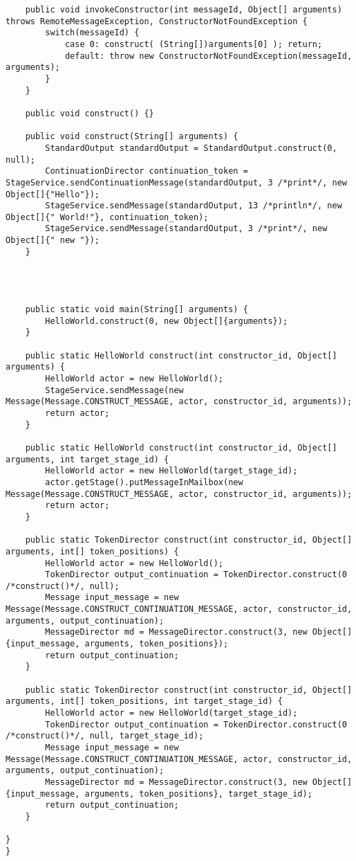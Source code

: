 \documentclass[12pt]{article}
\begin{document}
\begin{lstlisting}
    public void invokeConstructor(int messageId, Object[] arguments) throws RemoteMessageException, ConstructorNotFoundException {
        switch(messageId) {
            case 0: construct( (String[])arguments[0] ); return;
            default: throw new ConstructorNotFoundException(messageId, arguments);
        }
    }

    public void construct() {}

    public void construct(String[] arguments) {
        StandardOutput standardOutput = StandardOutput.construct(0, null);
        ContinuationDirector continuation_token = StageService.sendContinuationMessage(standardOutput, 3 /*print*/, new Object[]{"Hello"});
        StageService.sendMessage(standardOutput, 13 /*println*/, new Object[]{" World!"}, continuation_token);
        StageService.sendMessage(standardOutput, 3 /*print*/, new Object[]{" new "});
    }




    public static void main(String[] arguments) {
        HelloWorld.construct(0, new Object[]{arguments});
    }

    public static HelloWorld construct(int constructor_id, Object[] arguments) {
        HelloWorld actor = new HelloWorld();
        StageService.sendMessage(new Message(Message.CONSTRUCT_MESSAGE, actor, constructor_id, arguments));
        return actor;
    }

    public static HelloWorld construct(int constructor_id, Object[] arguments, int target_stage_id) {
        HelloWorld actor = new HelloWorld(target_stage_id);
        actor.getStage().putMessageInMailbox(new Message(Message.CONSTRUCT_MESSAGE, actor, constructor_id, arguments));
        return actor;
    }

    public static TokenDirector construct(int constructor_id, Object[] arguments, int[] token_positions) {
        HelloWorld actor = new HelloWorld();
        TokenDirector output_continuation = TokenDirector.construct(0 /*construct()*/, null);
        Message input_message = new Message(Message.CONSTRUCT_CONTINUATION_MESSAGE, actor, constructor_id, arguments, output_continuation);
        MessageDirector md = MessageDirector.construct(3, new Object[]{input_message, arguments, token_positions});
        return output_continuation;
    }

    public static TokenDirector construct(int constructor_id, Object[] arguments, int[] token_positions, int target_stage_id) {
        HelloWorld actor = new HelloWorld(target_stage_id);
        TokenDirector output_continuation = TokenDirector.construct(0 /*construct()*/, null, target_stage_id);
        Message input_message = new Message(Message.CONSTRUCT_CONTINUATION_MESSAGE, actor, constructor_id, arguments, output_continuation);
        MessageDirector md = MessageDirector.construct(3, new Object[]{input_message, arguments, token_positions}, target_stage_id);
        return output_continuation;
    }

}
}\end{lstlisting} 
\end{document}
